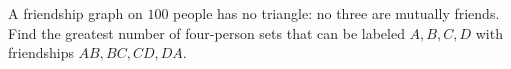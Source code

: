 A friendship graph on $100$ people has no triangle: no three are mutually friends. Find the greatest number of four-person sets that can be labeled $A,B,C,D$ with friendships $AB,BC,CD,DA$.
